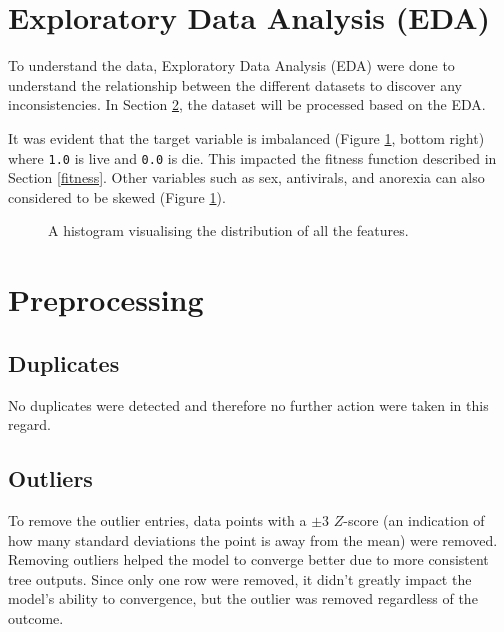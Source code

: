 \documentclass{article}
\begin{document}
\section{Exploratory Data Analysis (EDA)}
\label{EDA}
To understand the data, Exploratory Data Analysis (EDA) were done to understand the relationship between the different datasets to discover any inconsistencies. In Section \ref{preprocessing}, the dataset will be processed based on the EDA.

It was evident that the target variable is imbalanced (Figure \ref{allDist}, bottom right) where \texttt{1.0} is live and \texttt{0.0} is die. This impacted the fitness function described in Section \ref{fitness}. Other variables such as sex, antivirals, and anorexia can also considered to be skewed (Figure \ref{allDist}). 

\begin{figure}[H]
  \caption{A histogram visualising the distribution of all the features.}
  \label{allDist}
\end{figure}

\section{Preprocessing}
\label{preprocessing}
\subsection{Duplicates}
No duplicates were detected and therefore no further action were taken in this regard.

\subsection{Outliers}
To remove the outlier entries, data points with a \(\pm{3}\) \(Z\)-score (an indication of how many standard deviations the point is away from the mean) were removed. Removing outliers helped the model to converge better due to more consistent tree outputs. Since only one row were removed, it didn't greatly impact the model's ability to convergence, but the outlier was removed regardless of the outcome.
\end{document}
